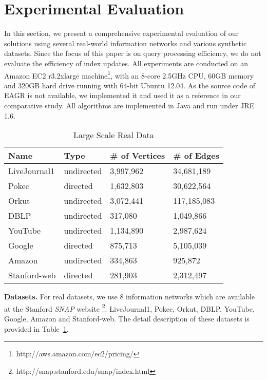 \section{Experimental Evaluation}\label{sec:experiments}
In this section, we present a comprehensive experimental evaluation 
of our solutions using several real-world information networks and 
various synthetic datasets. Since the focus of this paper is on query processing efficiency, 
we do not evaluate the efficiency of index updates. 
All experiments are conducted on an 
Amazon EC2 r3.2xlarge machine\footnote{http://aws.amazon.com/ec2/pricing/}, 
with an 8-core 2.5GHz CPU, 60GB memory and 320GB hard drive 
running with 64-bit Ubuntu 12.04. As the source code of EAGR is not
available, we implemented it and used it as a reference in our comparative
study.  
All algorithms are implemented in Java and run under JRE 1.6.

\begin{table}[h]
\centering
\begin{tabular}{|l|l|l|l|}
\hline 
\rule[-1ex]{0pt}{2.5ex} Name & Type & \# of Vertices & \# of Edges \\ 
\hline 
\rule[-1ex]{0pt}{2.5ex} LiveJournal1 & undirected & 3,997,962 & 34,681,189 \\ 
\hline 
\rule[-1ex]{0pt}{2.5ex} Pokec & directed & 1,632,803 & 30,622,564 \\ 
\hline 
\rule[-1ex]{0pt}{2.5ex} Orkut & undirected & 3,072,441 & 117,185,083 \\ 
\hline 
\rule[-1ex]{0pt}{2.5ex} DBLP & undirected & 317,080 & 1,049,866 \\ 
\hline 
\rule[-1ex]{0pt}{2.5ex} YouTube & undirected & 1,134,890 & 2,987,624 \\ 
\hline 
\rule[-1ex]{0pt}{2.5ex} Google & directed & 875,713 & 5,105,039 \\ 
\hline 
\rule[-1ex]{0pt}{2.5ex} Amazon & undirected & 334,863 & 925,872 \\ 
\hline 
\rule[-1ex]{0pt}{2.5ex} Stanford-web & directed & 281,903 &  2,312,497 \\ 
\hline 
\end{tabular}
\caption{Large Scale Real Data}
\label{tab:realdata}
\end{table}


\textbf{Datasets.} For real datasets, we use 8 information networks 
which are available at the Stanford \emph{SNAP} 
website \footnote{http://snap.stanford.edu/snap/index.html}: 
LiveJournal1, Pokec, Orkut, DBLP, YouTube, Google, Amazon and Stanford-web. 
The detail description of these datasets is provided in 
Table~\ref{tab:realdata}. 

